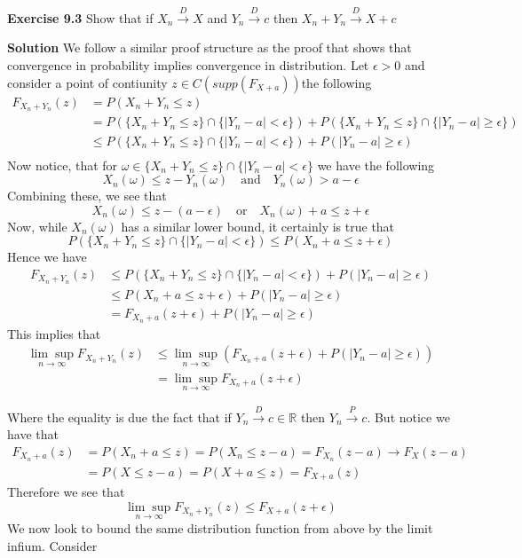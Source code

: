 \documentclass[12pt]{article}  %
\newcommand{\R}{{\mathbb{R}}}
\newcommand{\e}{{\epsilon}}
\begin{document}
\textbf{Exercise 9.3} Show that if $X_n\overset{D}{\to}X$ and $Y_n\overset{D}{\to}c$ then $X_n + Y_n \overset{D}{\to} X + c$

\textbf{Solution} We follow a similar proof structure as the proof that shows that convergence in probability implies convergence in distribution. Let $\e>0$ and consider a point of contiunity $z\in C(supp(F_{X+a}))$the following  
\begin{align*}
F_{X_n + Y_n}(z) &= P(X_n + Y_n\leq z)\\
&= P(\{X_n + Y_n\leq z\}\cap \{|Y_n -a|<\e\}) + P(\{X_n + Y_n\leq z\}\cap \{|Y_n -a|\geq\e\}) \\
&\leq P(\{X_n + Y_n\leq z\}\cap \{|Y_n -a|<\e\}) + P(|Y_n -a|\geq\e)\\
\end{align*}
Now notice, that for $\omega \in \{X_n + Y_n\leq z\}\cap \{|Y_n -a|<\e\}$ we have the following 
$$X_n(\omega) \leq z - Y_n(\omega)\hspace{1em}\text{and}\hspace{1em}Y_n(\omega) > a-\e $$
Combining these, we see that $$X_n(\omega)\leq z - (a-\e) \hspace{1em}\text{or}\hspace{1em}X_n(\omega) + a\leq z + \e$$ 
Now, while $X_n(\omega)$ has a similar lower bound, it certainly is true that $$P(\{X_n + Y_n\leq z\}\cap \{|Y_n -a|<\e\})\leq P(X_n + a\leq z + \e)$$ Hence we have 
\begin{align*}
F_{X_n + Y_n}(z)&\leq P(\{X_n + Y_n\leq z\}\cap \{|Y_n -a|<\e\}) + P(|Y_n -a|\geq\e)\\
&\leq P(X_n + a\leq z + \e) + P(|Y_n -a|\geq\e)\\
&= F_{X_n + a}(z+\e) + P(|Y_n -a|\geq\e)
\end{align*}
This implies that 
\begin{align*}
\underset{n\to\infty}{\lim\sup}F_{X_n + Y_n}(z)&\leq \underset{n\to\infty}{\lim\sup}\left(F_{X_n + a}(z+\e) + P(|Y_n -a|\geq\e)\right)\\
&= \underset{n\to\infty}{\lim\sup}F_{X_n + a}(z+\e) 
\end{align*}

Where the equality is due the fact that if $Y_n \overset{D}{\to} c\in\R$ then $Y_n \overset{P}{\to} c$. But notice we have that 
\begin{align*}
F_{X_n + a}(z) &= P(X_n+a \leq z) = P(X_n \leq z - a) = F_{X_n}(z-a)\to F_{X}(z-a)\\
&= P(X\leq z - a) = P(X+a\leq z) = F_{X+a}(z)
\end{align*}
Therefore we see that $$\underset{n\to\infty}{\lim\sup}F_{X_n + Y_n}(z)\leq F_{X+a}(z+\e)$$
We now look to bound the same distribution function from above by the limit infium. Consider 
\end{document}
